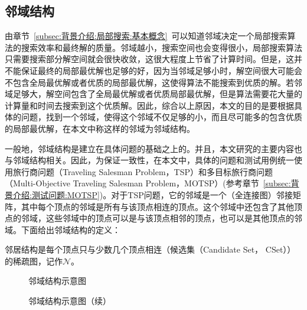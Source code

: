 \subsection{邻域结构}
\label{subsec:背景介绍:局部搜索:邻域结构}
由章节~\ref{subsec:背景介绍:局部搜索:基本概念}~可以知道邻域决定一个局部搜索算法的搜索效率和最终解的质量。邻域越小，搜索空间也会变得很小，局部搜索算法只需要搜索部分解空间就会很快收敛，这很大程度上节省了计算时间。但是，这并不能保证最终的局部最优解也足够的好，因为当邻域足够小时，解空间很大可能会不包含全局最优解或者优质的局部最优解，这使得算法不能搜索到优质的解。若邻域足够大，解空间包含了全局最优解或者优质局部最优解，但是算法需要花大量的计算量和时间去搜索到这个优质解。因此，综合以上原因，本文的目的是要根据具体的问题，找到一个邻域，使得这个邻域不仅足够的小，而且尽可能多的包含优质的局部最优解，在本文中称这样的邻域为邻域结构。
\par
一般地，邻域结构是建立在具体问题的基础之上的。并且，本文研究的主要内容也与邻域结构相关。因此，为保证一致性，在本文中，具体的问题和测试用例统一使用旅行商问题（Traveling Salesman Problem，TSP）和多目标旅行商问题（Multi-Objective Traveling Salesman Problem，MOTSP）(参考章节~\ref{subsec:背景介绍:测试问题:MOTSP})。对于TSP问题，它的邻域是一个（全连接图）邻接矩阵，其中每个顶点的邻域是所有与该顶点相连的顶点。这个邻域中还包含了其他顶点的邻域，这些邻域中的顶点可以是与该顶点相邻的顶点，也可以是其他顶点的邻域。下面给出邻域结构的定义：
\begin{definition}
    \label{def:邻域结构}
    邻居结构是每个顶点只与少数几个顶点相连（候选集（Candidate Set， CSet））的稀疏图，记作$\mathcal{N}$。
\end{definition}
\begin{figure}[htb]
    \caption[邻域结构示意图]{邻域结构示意图}
    \label{fig:邻域结构示意图}
\end{figure}
\begin{figure}[htb]
    \ContinuedFloat
    \caption[]{邻域结构示意图（续）}
\end{figure}
